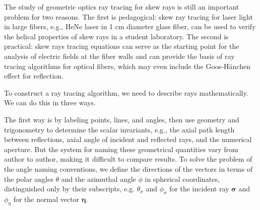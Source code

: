 \documentclass[a4paper,twocolumn,superscriptaddress]{revtex4-1}
\begin{document}
The study of geometric optics ray tracing for skew rays is still an important problem for two reasons. 
The first is pedagogical: skew ray tracing for laser light in large fibers, e.g., HeNe laser in 1 cm diameter glass fiber, can be used to verify the helical properties of skew rays in a student laboratory. 
The second is practical: skew rays tracing equations can serve as the starting point for the analysis of electric fields at the fiber walls\cite{Lin} and can provide the basis of ray tracing algorithms for optical fibers\cite{Witkowski}, which may even include the Goos-H\"{a}nchen effect for reflection\cite{kovac2}. 

To construct a ray tracing algorithm, we need to describe rays mathematically. We can do this in three ways.

The first way is by labeling points, lines, and angles, then use geometry and trigonometry to determine the scalar invariants, e.g., the axial path length between reflections, axial angle of incident and reflected rays, and the numerical aperture. 
But the system for naming these geometrical quantities vary from author to author, making it difficult to compare results.
\cite{Potter, senior,kovac,sugonSPP, lovesnyder}
To solve the problem of the angle naming conventions, we define the directions of the vectors in terms of the polar angles $\theta$ and the azimuthal angle $\phi$ in spherical coordinates, distinguished only by their subscripts, e.g. $\theta_{\sigma}$ and $\phi_{\sigma}$ for the incident ray $\bm \sigma$ and $\phi_{\eta}$ for the normal vector $\bm \eta$.
\end{document}
